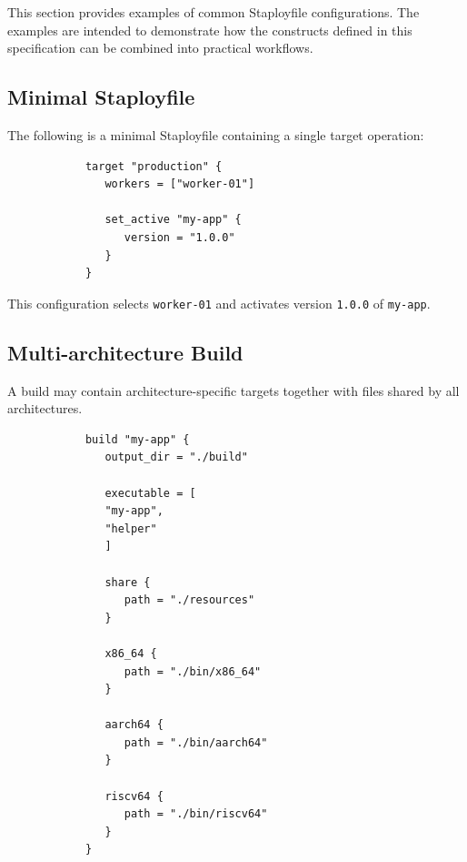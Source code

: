 \documentclass[11pt,a4paper]{article}
\begin{document}
    This section provides examples of common Staployfile configurations.
    The examples are intended to demonstrate how the constructs defined in this specification can be combined into practical workflows.

    \subsection{Minimal Staployfile}\label{subsec:minimal-staployfile}

    The following is a minimal Staployfile containing a single target operation:

    \begin{center}
        \begin{verbatim}
            target "production" {
               workers = ["worker-01"]

               set_active "my-app" {
                  version = "1.0.0"
               }
            }
        \end{verbatim}
    \end{center}

    This configuration selects \texttt{worker-01} and activates version \texttt{1.0.0} of \texttt{my-app}.

    \subsection{Multi-architecture Build}\label{subsec:multi-architecture-build}

    A build may contain architecture-specific targets together with files shared by all architectures.

    \begin{center}
        \begin{verbatim}
            build "my-app" {
               output_dir = "./build"

               executable = [
               "my-app",
               "helper"
               ]

               share {
                  path = "./resources"
               }

               x86_64 {
                  path = "./bin/x86_64"
               }

               aarch64 {
                  path = "./bin/aarch64"
               }

               riscv64 {
                  path = "./bin/riscv64"
               }
            }
        \end{verbatim}
    \end{center}
\end{document}
